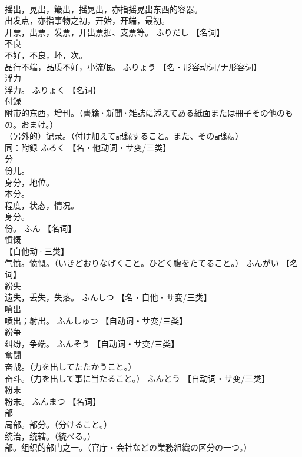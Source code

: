 \documentclass[8pt]{extreport}
\begin{document}
\begin{CJK}{UTF8}{min}
\\	摇出，晃出，簸出，摇晃出，亦指摇晃出东西的容器。 
\\	出发点，亦指事物之初，开始，开端，最初。 
\\	开票，出票，发票，开出票据、支票等。	ふりだし		【名词】
\\	不良	
\\	不好，不良，坏，次。 
\\	品行不端，品质不好，小流氓。	ふりょう		【名・形容动词/ナ形容词】
\\	浮力	
\\	浮力。	ふりょく		【名词】
\\	付録	
\\	附带的东西，增刊。（書籍·新聞·雑誌に添えてある紙面または冊子その他のもの。おまけ。） 
\\	（另外的）记录。（付け加えて記録すること。また、その記録。） 
\\	同：附録	ふろく		【名・他动词・サ变/三类】
\\	分	
\\	份儿。 
\\	身分，地位。 
\\	本分。 
\\	程度，状态，情况。 
\\	身分。 
\\	份。	ふん		【名词】
\\	憤慨	
\\	【自他动·三类】 
\\	气愤。愤慨。（いきどおりなげくこと。ひどく腹をたてること。）	ふんがい		【名词】
\\	紛失	
\\	遗失，丢失，失落。	ふんしつ		【名・自他・サ变/三类】
\\	噴出	
\\	喷出；射出。	ふんしゅつ		【自动词・サ变/三类】
\\	紛争	
\\	纠纷，争端。	ふんそう		【自动词・サ变/三类】
\\	奮闘	
\\	奋战。（力を出してたたかうこと。） 
\\	奋斗。（力を出して事に当たること。）	ふんとう		【自动词・サ变/三类】
\\	粉末	
\\	粉末。	ふんまつ		【名词】
\\	部	
\\	局部。部分。（分けること。） 
\\	统治，统辖。（統べる。） 
\\	部。组织的部门之一。（官庁・会社などの業務組織の区分の一つ。） 

\end{CJK}
\end{document}
